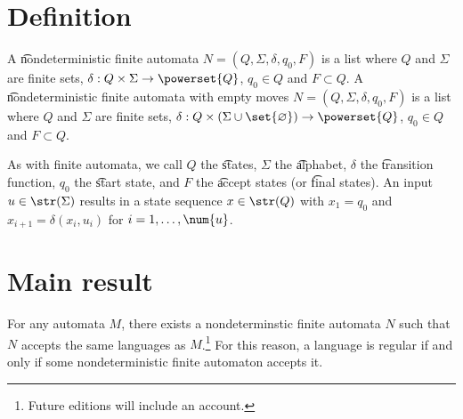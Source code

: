 

\section*{Definition}

A \t{nondeterministic finite automata} $N = (Q, \Sigma , \delta , q_0, F)$ is a list where $Q$ and $\Sigma $ are finite sets, $\delta : Q \times  \Sigma  \to \powerset{Q}$, $q_0 \in Q$ and $F \subset Q$.
A \t{nondeterministic finite automata with empty moves} $N = (Q, \Sigma , \delta , q_0, F)$ is a list where $Q$ and $\Sigma $ are finite sets, $\delta : Q \times  (\Sigma  \cup \set{\varnothing}) \to \powerset{Q}$, $q_0 \in Q$ and $F \subset Q$.

As with finite automata, we call $Q$ the \t{states}, $\Sigma $ the \t{alphabet}, $\delta $ the \t{transition function}, $q_0$ the \t{start state}, and $F$ the \t{accept states} (or \t{final states}).
An input $u \in \str(\Sigma )$ results in a state sequence $x \in \str(Q)$ with $x_1 = q_0$ and $x_{i+1} = \delta (x_i, u_i)$ for $i = 1, \dots , \num{u}$.

\section*{Main result}

For any automata $M$, there exists a nondeterminstic finite automata $N$ such that $N$ accepts the same languages as $M$.\footnote{Future editions will include an account.}
For this reason, a language is regular if and only if some nondeterministic finite automaton accepts it.

\blankpage